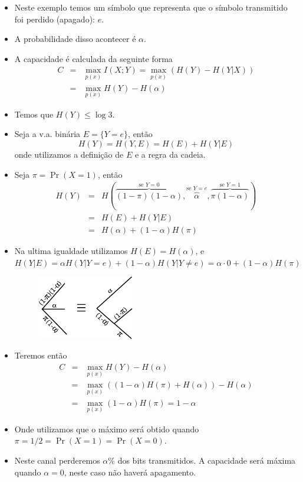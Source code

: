 \begin{frame}[allowframebreaks]
  \begin{itemize}
  \item Neste exemplo temos um símbolo que representa que o símbolo transmitido 
	foi perdido (apagado): $e$.
  \item A probabilidade disso acontecer é $\alpha$.
  \item A capacidade é calculada da seguinte forma
	\begin{eqnarray}
	C &=& \max_{p(x)} I(X;Y) = \max_{p(x)} \left( H(Y) - H(Y|X) \right) \nonumber \\
	  &=& \max_{p(x)} H(Y) - H(\alpha)
	\end{eqnarray}
  \item Temos que $H(Y) \leq \log 3$.
  \item Seja a v.a. binária $E = \{Y = e\}$, então
	\begin{equation}
	H(Y) = H(Y,E) = H(E) + H(Y|E)
	\end{equation} 
	onde utilizamos a definição de $E$ e a regra da cadeia.
  \item Seja $\pi = \Pr(X=1)$, então 
	\begin{eqnarray}
	H(Y) 	&=& H\left( \overbrace{(1-\pi)(1-\alpha)}^{\text{se }Y=0} , \overbrace{\alpha}^{\text{se }Y=e} , \overbrace{\pi(1-\alpha)}^{\text{se }Y=1} \right) \nonumber \\
		&=& H(E) + H(Y|E) \nonumber \\
		&=& H(\alpha) + (1 - \alpha) H(\pi)
	\end{eqnarray}
  \item Na ultima igualdade utilizamos $H(E) = H(\alpha)$, e 
	$H(Y|E) = \alpha H(Y|Y=e) + (1-\alpha) H(Y|Y\neq e) = \alpha \cdot 0 + (1-\alpha) H(\pi)$
                \begin{figure}[h!]
                \centering
                \includegraphics[width=0.4\textwidth]{images/eqvh.pdf}
                \label{fig:eqvh}
                \end{figure}

  \item Teremos então 
	\begin{eqnarray}
	C &=& \max_{p(x)} H(Y) - H(\alpha) \nonumber \\
	&=& \max_{p(x)} \left( (1-\alpha) H(\pi) + H(\alpha) \right) - H(\alpha) \nonumber \\
	&=& \max_{p(x)} (1-\alpha) H(\pi) = 1 - \alpha
	\end{eqnarray}
  \item Onde utilizamos que o máximo será obtido quando $\pi = 1/2 = \Pr(X=1) = \Pr(X=0)$.
  \item Neste canal perderemos $\alpha$\% dos bits transmitidos. A capacidade será máxima
	quando $\alpha = 0$, neste caso não haverá apagamento. 
  \end{itemize}
\end{frame}


